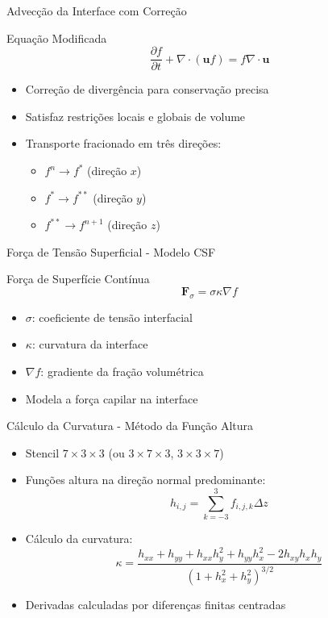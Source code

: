 \documentclass[../main/main.tex]{subfiles}
\begin{document}
\begin{frame}{Advecção da Interface com Correção}
  \begin{block}{Equação Modificada}
    \[
      \frac{\partial f}{\partial t} + \nabla \cdot (\mathbf{u} f) = f \nabla \cdot \mathbf{u}
    \]
  \end{block}
  \vspace{0.3cm}
  \begin{itemize}
    \item Correção de divergência para conservação precisa
    \item Satisfaz restrições locais e globais de volume
    \item Transporte fracionado em três direções:
      \begin{itemize}
        \item $f^{n} \to f^{*}$ (direção $x$)
        \item $f^{*} \to f^{**}$ (direção $y$)
        \item $f^{**} \to f^{n+1}$ (direção $z$)
      \end{itemize}
  \end{itemize}
\end{frame}

\begin{frame}{Força de Tensão Superficial - Modelo CSF}
  \begin{block}{Força de Superfície Contínua}
    \[
      \mathbf{F}_\sigma = \sigma \kappa \nabla f
    \]
  \end{block}
  \vspace{0.5cm}
  \begin{itemize}
    \item $\sigma$: coeficiente de tensão interfacial
    \item $\kappa$: curvatura da interface
    \item $\nabla f$: gradiente da fração volumétrica
    \item Modela a força capilar na interface
  \end{itemize}
\end{frame}

\begin{frame}{Cálculo da Curvatura - Método da Função Altura}
  \begin{itemize}
    \item Stencil $7 \times 3 \times 3$ (ou $3 \times 7 \times 3$, $3 \times 3 \times 7$)
    \item Funções altura na direção normal predominante:
      \[
        h_{i,j} = \sum_{k=-3}^{3} f_{i,j,k} \Delta z
      \]
    \item Cálculo da curvatura:
      \scriptsize
      \[
        \kappa = \frac{h_{xx} + h_{yy} + h_{xx}h_y^2 + h_{yy}h_x^2 - 2h_{xy}h_x h_y}{(1 + h_x^2 + h_y^2)^{3/2}}
      \]
      \normalsize
    \item Derivadas calculadas por diferenças finitas centradas
  \end{itemize}
\end{frame}
\end{document}

